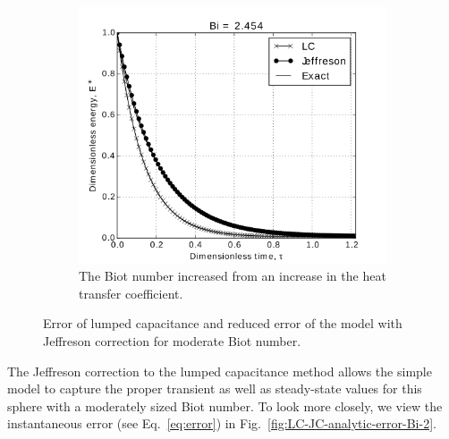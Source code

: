 \begin{figure}
        \begin{subfigure}[b]{0.5\textwidth}
                \includegraphics[width=\textwidth]{chapters/figures/LC-JC-analytic-sphere-in-fluid-Bi-2b}
                \caption{The Biot number increased from  an increase in the heat transfer coefficient.}
				\label{fig:LC-JC-analytic-sphere-in-fluid-Bi-2b}
        \end{subfigure}
        \caption[Error of lumped capacitance and Jeffreson correction for moderate Biot number]{Error of lumped capacitance and reduced error of the model with Jeffreson correction for moderate Biot number.}\label{fig:LC-JC-analytic-sphere-in-fluid-Bi-2}
\end{figure}

The Jeffreson correction to the lumped capacitance method allows the simple model to capture the proper transient as well as steady-state values for this sphere with a moderately sized Biot number. To look more closely, we view the instantaneous error (see Eq.~\ref{eq:error}) in Fig.~\ref{fig:LC-JC-analytic-error-Bi-2}.

